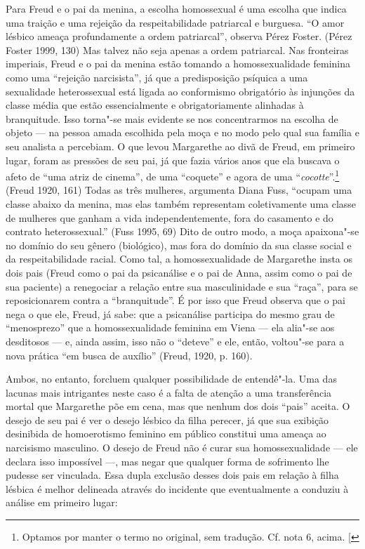 Para Freud e o pai da menina, a escolha homossexual é uma escolha que
indica uma traição e uma rejeição da respeitabilidade patriarcal e
burguesa. ``O amor lésbico ameaça profundamente a ordem patriarcal'',
observa Pérez Foster. (Pérez Foster 1999, 130) Mas talvez não seja
apenas a ordem patriarcal. Nas fronteiras imperiais, Freud e o pai da
menina estão tomando a homossexualidade feminina como uma ``rejeição
narcisista'', já que a predisposição psíquica a uma sexualidade
heterossexual está ligada ao conformismo obrigatório às injunções da
classe média que estão essencialmente e obrigatoriamente alinhadas à
branquitude. Isso torna"-se mais evidente se nos concentrarmos na escolha
de objeto --- na pessoa amada escolhida pela moça e no modo pelo qual sua
família e seu analista a percebiam. O que levou Margarethe ao divã de
Freud, em primeiro lugar, foram as pressões de seu pai, já que fazia
vários anos que ela buscava o afeto de ``uma atriz de cinema'', de uma
``coquete'' e agora de uma ``\emph{cocotte}''.\footnote{Optamos por manter o
  termo no original, sem tradução. Cf. nota 6, acima. {[}\versal{N.~T.}{]}}
(Freud 1920, 161) Todas as três mulheres, argumenta Diana Fuss, ``ocupam
uma classe abaixo da menina, mas elas também representam coletivamente
uma classe de mulheres que ganham a vida independentemente, fora do
casamento e do contrato heterossexual.'' (Fuss 1995, 69) Dito de outro
modo, a moça apaixona"-se no domínio do seu gênero (biológico), mas fora
do domínio da sua classe social e da respeitabilidade racial. Como tal,
a homossexualidade de Margarethe insta os dois pais (Freud como o pai da
psicanálise e o pai de Anna, assim como o pai de sua paciente) a
renegociar a relação entre sua masculinidade e sua ``raça'', para se
reposicionarem contra a ``branquitude''. É por isso que Freud observa que
o pai nega o que ele, Freud, já sabe: que a psicanálise participa do
mesmo grau de ``menosprezo'' que a homossexualidade feminina em Viena ---
ela alia"-se aos desditosos --- e, ainda assim, isso não o ``deteve'' e
ele, então, voltou"-se para a nova prática ``em busca de auxílio''
(Freud, 1920, p. 160).

Ambos, no entanto, forcluem qualquer possibilidade de entendê"-la. Uma
das lacunas mais intrigantes neste caso é a falta de atenção a uma
transferência mortal que Margarethe põe em cena, mas que nenhum dos dois
``pais'' aceita. O desejo de seu pai é ver o desejo lésbico da filha
perecer, já que sua exibição desinibida de homoerotismo feminino em
público constitui uma ameaça ao narcisismo masculino. O desejo de Freud
não é curar sua homossexualidade --- ele declara isso impossível ---, mas
negar que qualquer forma de sofrimento lhe pudesse ser vinculada. Essa
dupla exclusão desses dois pais em relação à filha lésbica é melhor
delineada através do incidente que eventualmente a conduziu à análise em
primeiro lugar:

